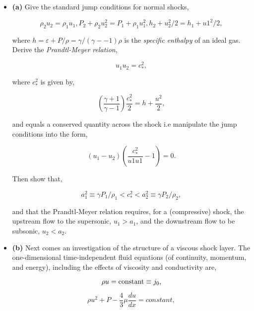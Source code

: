 \documentclass[12pt]{article}
\begin{document}
\begin{itemize}
\item \textbf{(a)} Give the standard jump conditions for normal shocks,

\begin{equation*}
\rho_2u_2 = \rho_1 u_1, P_2 + \rho_2 u_2^2 = P_1 + \rho_1u_1^2, h_2 + u_2^2/2 = h_1 + u1^2/2,
\end{equation*}

where $h = \varepsilon + P/\rho = \gamma / \left( \gamma --1\right)\rho$ is the {\it specific enthalpy} of an ideal gas. Derive the {\it Prandtl-Meyer relation},

\begin{equation*}
u_1u_2 = c_{*}^2,
\end{equation*}
 
 where $ c_{*}^2$ is given by,
 
 \begin{equation*}
 \left( \frac{\gamma + 1}{\gamma -1}\right)\frac{ c_{*}^2}{2} = h + \frac{u^2}{2},
 \end{equation*}
 
 and equals a conserved quantity across the shock i.e manipulate the jump conditions into the form,
 
 \begin{equation*}
 \left(u_1 - u_2\right)\left( \frac{ c_{*}^2}{u1u1} - 1 \right) = 0.
 \end{equation*}
 
Then show that,

\begin{equation*}
a_1^2 \equiv \gamma P_1/\rho_1 <  c_{*}^2 < a_2^2 \equiv \gamma P_2/\rho_2,
\end{equation*}

and that the Prandtl-Meyer relation requires, for a (compressive) shock, the upstream flow to the supersonic, $u_1 > a_1$, and the downstream flow to  be subsonic, $u_2 < a_2$.

\item \textbf{(b)} Next comes an investigation of the structure of a viscous shock layer. The one-dimensional time-independent fluid equations (of continuity, momentum, and energy), including the effects of viscosity and conductivity are,

\begin{equation*}
\rho u = {\rm constant} \equiv j_0,
\end{equation*}

\begin{equation*}
\rho u^2 + P - \frac{4}{3}\mu \frac{du}{dx} = constant,
\end{equation*}


\end{itemize}
\end{document}
